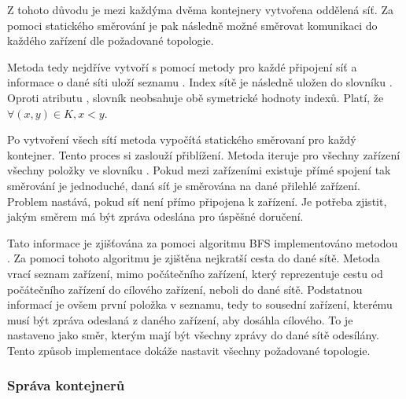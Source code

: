Z tohoto důvodu je mezi každýma dvěma kontejnery vytvořena oddělená síť. Za pomoci statického směrování je pak následně možné směrovat komunikaci do každého zařízení dle požadované topologie. 

Metoda tedy nejdříve vytvoří s pomocí metody  pro každé připojení síť a informace o dané síti uloží seznamu . Index sítě je následně uložen do slovníku . Oproti atributu , slovník neobsahuje obě symetrické hodnoty indexů. Platí, že $\forall (x,y) \in K, x < y$. 

Po vytvoření všech sítí metoda vypočítá statického směrovaní pro každý kontejner. Tento proces si zaslouží přiblížení. Metoda iteruje pro všechny zařízení všechny položky ve slovníku . Pokud mezi zařízeními existuje přímé spojení tak směrování je jednoduché, daná síť je směrována na dané přilehlé zařízení. Problem nastává, pokud síť není přímo připojena k zařízení. Je potřeba zjistit, jakým směrem má být zpráva odeslána pro úspěšné doručení.

Tato informace je zjišťována za pomoci algoritmu BFS implementováno metodou . Za pomoci tohoto algoritmu je zjištěna nejkratší cesta do dané sítě. Metoda vrací seznam zařízení, mimo počátečního zařízení, který reprezentuje cestu od počátečního zařízení do cílového zařízení, neboli do dané sítě. Podstatnou informací je ovšem první položka v seznamu, tedy to sousední zařízení, kterému musí být zpráva odeslaná z daného zařízení, aby dosáhla cílového. To je nastaveno jako směr, kterým mají být všechny zprávy do dané sítě odesílány. Tento způsob implementace dokáže nastavit všechny požadované topologie. 

\subsubsection{Správa kontejnerů}
